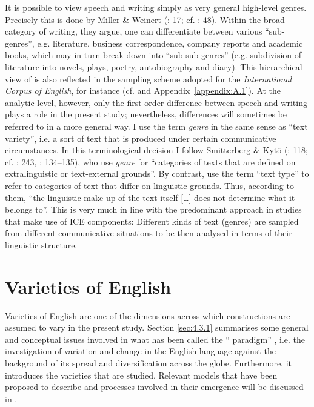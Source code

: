   It is possible to view speech and writing simply as very general high-level genres. Precisely this is done by Miller \& Weinert (\citeyear{MillerWeinert1998}: 17; cf. \citealt{Chafe1994}: 48). Within the broad  category of writing, they argue, one can differentiate between various “sub-genres”, e.g. literature, business correspondence, company reports and academic books, which may in turn break down into “sub-sub-genres” (e.g. subdivision of literature into novels, plays, poetry, autobiography and diary). This hierarchical view of  is also reflected in the sampling scheme adopted for the \textit{International Corpus of English}, for instance (cf.  and Appendix~\ref{appendix:A.1}). At the analytic level, however, only the first-order difference between speech and writing plays a role in the present study; nevertheless,  differences will sometimes be referred to in a more general way. I use the term \textit{genre} in the same sense as  “text variety”, i.e. a sort of text that is produced under certain communicative circumstances. In this terminological decision I follow Smitterberg \& Kytö (\citeyear{SmitterbergKytö2015}: 118; cf. \citealt{Meurman-Solin2001}: 243, \citealt{Moessner2001}: 134–135), who use \textit{genre} for “categories of texts that are defined on extralinguistic or text-external grounds”. By contrast,   \citet[118]{SmitterbergKytö2015} use the term “text type” to refer to categories of text that differ on linguistic grounds. Thus, according to them, “the linguistic make-up of the text itself […] does not determine what  it belongs to”. This is very much in line with the predominant approach in studies that make use of ICE components: Different kinds of text (genres) are sampled from different communicative situations to be then analysed in terms of their linguistic structure.

\section{\label{bkm:Ref35373991}\label{bkm:Ref35882627}Varieties of English}\label{sec:4.3}

Varieties of English are one of the dimensions across which constructions are assumed to vary in the present study. Section \ref{sec:4.3.1} summarises some general and conceptual issues involved in what has been called the “ paradigm” \citep{Mesthrie2003}, i.e. the investigation of variation and change in the English language against the background of its spread and diversification across the globe. Furthermore, it intro\-duces the varieties that are studied. Relevant models that have been proposed to describe  and processes involved in their emergence will be discussed in .

